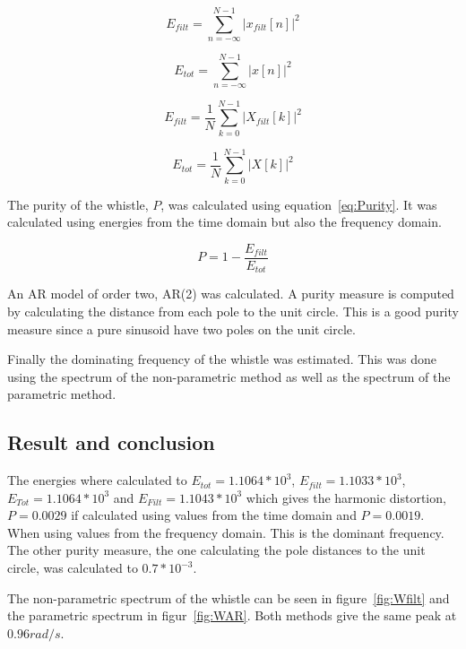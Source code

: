 \documentclass[10pt]{article}
\begin{document}
\begin{equation}
  \label{eq:Etimefilt}
  E_{filt} =\sum\limits_{n=-\infty}^{N-1} |x_{filt}[n]|^2
\end{equation}

\begin{equation}
  \label{eq:Etime}
  E_{tot} =\sum\limits_{n=-\infty}^{N-1} |x[n]|^2
\end{equation}

\begin{equation}
  \label{eq:Efeqfilt}
  E_{filt} =\frac{1}{N}\sum\limits_{k=0}^{N-1} |X_{filt}[k]|^2
\end{equation}

\begin{equation}
  \label{eq:Efeq}
  E_{tot} =\frac{1}{N}\sum\limits_{k=0}^{N-1} |X[k]|^2
\end{equation}

The purity of the whistle, $P$, was calculated using equation~\ref{eq:Purity}.
It was calculated using energies from the time domain but also the
frequency domain.

\begin{equation}
  \label{eq:Purity}
  P =1-\frac{E_{filt}}{E_{tot}}
\end{equation}

An AR model of order two, AR(2) was calculated. A purity measure
is computed by calculating the distance from each pole to the unit
circle. This is a good purity measure since a pure sinusoid have
two poles on the unit circle.

Finally the dominating frequency of the whistle was estimated.
This was done using the spectrum of the non-parametric method
as well as the spectrum of the parametric method.

\subsection{Result and conclusion}
The energies where calculated to $E_{tot}=1.1064*10^3$, $E_{filt}=1.1033*10^3$,
$E_{Tot}=1.1064*10^3$ and $E_{Filt}=1.1043*10^3$ which gives the harmonic distortion,
$P=0.0029$ if calculated using values from the time domain and $P=0.0019$.
When using values from the frequency domain. This is the dominant frequency.
The other purity measure, the one calculating the pole distances to the
unit circle, was calculated to $0.7*10^{-3}$.

The non-parametric spectrum of the whistle can be seen in figure~\ref{fig:Wfilt}
and the parametric spectrum in figur~\ref{fig:WAR}. Both methods give the same peak
at $0.96 rad/s$.
\end{document}

